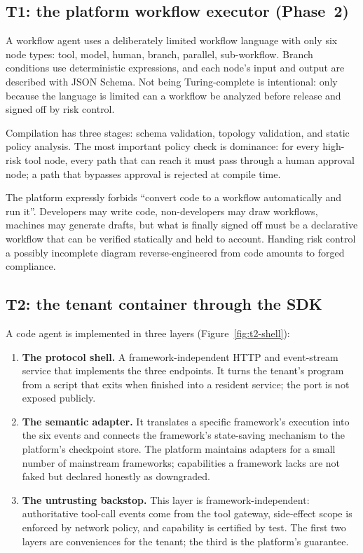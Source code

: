 \subsection{T1: the platform workflow executor (Phase~2)}

A workflow agent uses a deliberately limited workflow language with only six node types: tool, model, human, branch, parallel, sub-workflow. Branch conditions use deterministic expressions, and each node's input and output are described with JSON Schema. Not being Turing-complete is intentional: only because the language is limited can a workflow be analyzed before release and signed off by risk control.

Compilation has three stages: schema validation, topology validation, and static policy analysis. The most important policy check is dominance: for every high-risk tool node, every path that can reach it must pass through a human approval node; a path that bypasses approval is rejected at compile time.

The platform expressly forbids ``convert code to a workflow automatically and run it''. Developers may write code, non-developers may draw workflows, machines may generate drafts, but what is finally signed off must be a declarative workflow that can be verified statically and held to account. Handing risk control a possibly incomplete diagram reverse-engineered from code amounts to forged compliance.

\subsection{T2: the tenant container through the SDK}

A code agent is implemented in three layers (Figure~\ref{fig:t2-shell}):

\begin{enumerate}
  \item \textbf{The protocol shell.} A framework-independent HTTP and event-stream service that implements the three endpoints. It turns the tenant's program from a script that exits when finished into a resident service; the port is not exposed publicly.
  \item \textbf{The semantic adapter.} It translates a specific framework's execution into the six events and connects the framework's state-saving mechanism to the platform's checkpoint store. The platform maintains adapters for a small number of mainstream frameworks; capabilities a framework lacks are not faked but declared honestly as downgraded.
  \item \textbf{The untrusting backstop.} This layer is framework-independent: authoritative tool-call events come from the tool gateway, side-effect scope is enforced by network policy, and capability is certified by test. The first two layers are conveniences for the tenant; the third is the platform's guarantee.
\end{enumerate}

